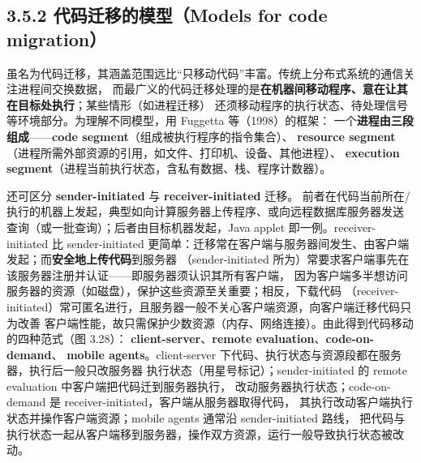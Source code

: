 
\subsection*{3.5.2 代码迁移的模型（Models for code migration）}
虽名为代码迁移，其涵盖范围远比“只移动代码”丰富。传统上分布式系统的通信关注进程间交换数据，
而最广义的代码迁移处理的是\textbf{在机器间移动程序、意在让其在目标处执行}；某些情形（如进程迁移）
还须移动程序的执行状态、待处理信号等环境部分。为理解不同模型，用 Fuggetta 等（1998）的框架：
一个\textbf{进程由三段组成}——\textbf{code segment}（组成被执行程序的指令集合）、
\textbf{resource segment}（进程所需外部资源的引用，如文件、打印机、设备、其他进程）、
\textbf{execution segment}（进程当前执行状态，含私有数据、栈、程序计数器）。

\medskip\noindent 还可区分 \textbf{sender-initiated} 与 \textbf{receiver-initiated} 迁移。
前者在代码当前所在/执行的机器上发起，典型如向计算服务器上传程序、或向远程数据库服务器发送
查询（或一批查询）；后者由目标机器发起，Java applet 即一例。receiver-initiated 比 sender-initiated
更简单：迁移常在客户端与服务器间发生、由客户端发起；而\textbf{安全地上传代码}到服务器
（sender-initiated 所为）常要求客户端事先在该服务器注册并认证——即服务器须认识其所有客户端，
因为客户端多半想访问服务器的资源（如磁盘），保护这些资源至关重要；相反，下载代码
（receiver-initiated）常可匿名进行，且服务器一般不关心客户端资源，向客户端迁移代码只为改善
客户端性能，故只需保护少数资源（内存、网络连接）。由此得到代码移动的四种范式（图 3.28）：
\textbf{client-server}、\textbf{remote evaluation}、\textbf{code-on-demand}、
\textbf{mobile agents}。client-server 下代码、执行状态与资源段都在服务器，执行后一般只改服务器
执行状态（用星号标记）；sender-initiated 的 remote evaluation 中客户端把代码迁到服务器执行，
改动服务器执行状态；code-on-demand 是 receiver-initiated，客户端从服务器取得代码，
其执行改动客户端执行状态并操作客户端资源；mobile agents 通常沿 sender-initiated 路线，
把代码与执行状态一起从客户端移到服务器，操作双方资源，运行一般导致执行状态被改动。

